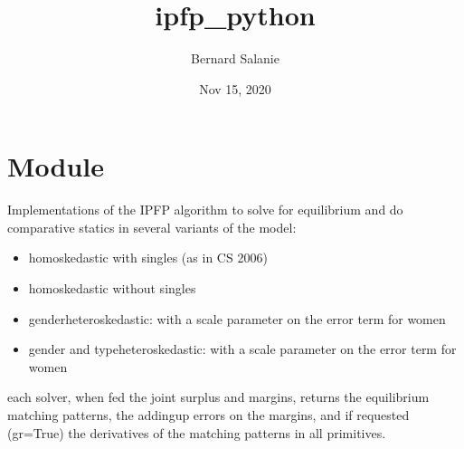 \documentclass[letterpaper,10pt,english]{sphinxmanual}
\title{ipfp\_python}
\date{Nov 15, 2020}
\author{Bernard Salanie}
\begin{document}
\pagestyle{empty}
\sphinxmaketitle
\pagestyle{plain}
\sphinxtableofcontents
\pagestyle{normal}
\label{\detokenize{index::doc}}



\chapter{Module }
\label{\detokenize{ipfp_solvers:module-ipfp_solvers}}\label{\detokenize{ipfp_solvers:module-ipfp-solvers}}\label{\detokenize{ipfp_solvers::doc}}
Implementations of the IPFP algorithm to solve for equilibrium and do comparative statics
in several variants of the  model:
\begin{itemize}
\item {} 
homoskedastic with singles (as in CS 2006)

\item {} 
homoskedastic without singles

\item {} 
gender\sphinxhyphen{}heteroskedastic: with a scale parameter on the error term for women

\item {} 
gender\sphinxhyphen{} and type\sphinxhyphen{}heteroskedastic: with a scale parameter on the error term for women

\end{itemize}

each solver, when fed the joint surplus and margins,
returns the equilibrium matching patterns, the adding\sphinxhyphen{}up errors on the margins,
and if requested (gr=True) the derivatives of the matching patterns in all primitives.
\end{document}
